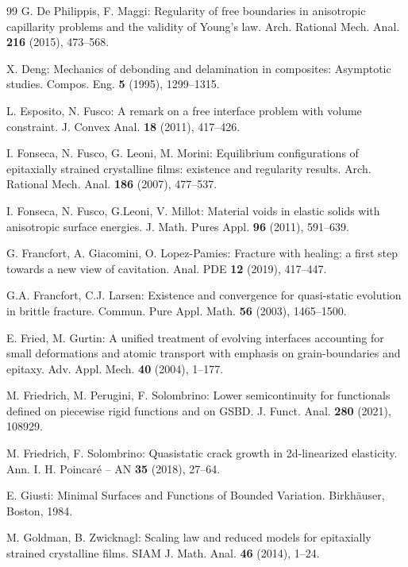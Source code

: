 \documentclass[reqno]{amsart}
\numberwithin{equation}{section}
\theoremstyle{plain}
\theoremstyle{definition}
\begin{document}
\begin{thebibliography}{99}
 G. De Philippis, F.  Maggi: Regularity of free boundaries in anisotropic capillarity problems and the validity of Young's law. Arch. Rational Mech. Anal. {\bf 216} (2015), 473--568. 

  X. Deng:  Mechanics of debonding and delamination in composites: Asymptotic studies. Compos. Eng. {\bf 5} (1995),  1299--1315.

  L. Esposito,  N. Fusco:  A remark on a free interface problem with volume constraint. J. Convex Anal. {\bf18} (2011), 417--426.

 I. Fonseca, N. Fusco, G. Leoni, 
M. Morini: Equilibrium configurations of epitaxially strained crystalline films: existence and regularity results. Arch. Rational Mech. Anal.  \textbf{186} (2007), 477--537.

  I. Fonseca, N.  Fusco, G.Leoni, V. Millot: Material voids in elastic solids with anisotropic surface energies. J. Math. Pures Appl. \textbf{96} (2011), 591--639.        

 G. Francfort, A. Giacomini, O. Lopez-Pamies: Fracture with healing: a first step towards a new view of cavitation. Anal. PDE {\bf 12} (2019), 417--447.

 G.A. Francfort, C.J. Larsen: Existence and convergence for quasi-static evolution in brittle fracture. Commun. Pure Appl. Math. {\bf56} (2003), 1465--1500.

 E. Fried, M. Gurtin: A unified treatment of evolving interfaces accounting for small deformations and atomic transport with emphasis on grain-boundaries and epitaxy. Adv. Appl. Mech. {\bf 40} (2004), 1--177.

 M. Friedrich, M. Perugini, F. Solombrino: Lower semicontinuity for functionals defined on piecewise rigid functions and on GSBD. J. Funct. Anal. {\bf 280} (2021), 108929.

 M. Friedrich, F. Solombrino:  Quasistatic crack growth in 2d-linearized elasticity. Ann. I. H. Poincar\'e -- AN {\bf35} (2018), 27--64.

 E. Giusti:  Minimal Surfaces and Functions of Bounded Variation.  Birkh\"auser, Boston, 1984. 

 M. Goldman, B. Zwicknagl:  Scaling law and reduced models for epitaxially  strained crystalline films. SIAM J. Math. Anal. {\bf 46} (2014), 1--24.


\end{thebibliography}
\end{document}
